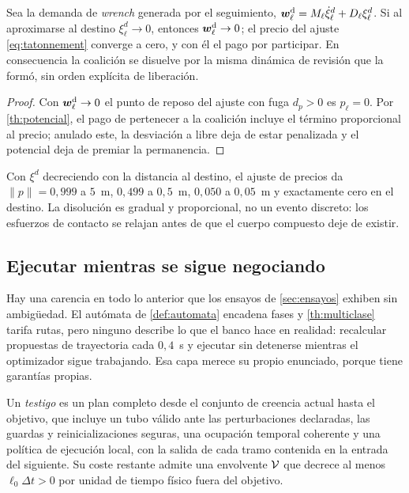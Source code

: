 \begin{proposicion}
\label{pr:extincion}
Sea la demanda de \emph{wrench} generada por el seguimiento,
$\bm{w}^{\mathrm{d}}_\ell=M_\ell\dot\xi^d_\ell+D_\ell\xi^d_\ell$. Si al aproximarse al destino
$\xi^d_\ell\to0$, entonces $\bm{w}^{\mathrm{d}}_\ell\to0$; el precio del ajuste
\eqref{eq:tatonnement} converge a cero, y con él el pago por participar. En
consecuencia la coalición se disuelve por la misma dinámica de revisión que la
formó, sin orden explícita de liberación.
\end{proposicion}

\begin{proof}
Con $\bm{w}^{\mathrm{d}}_\ell\to0$ el punto de reposo del ajuste con fuga $d_p>0$ es
$p_\ell=0$. Por \cref{th:potencial}, el pago de pertenecer a la coalición
incluye el término proporcional al precio; anulado este, la desviación a
\textsf{libre} deja de estar penalizada y el potencial deja de premiar la
permanencia.
\end{proof}

\begin{observacion}
\label{obs:extincion-num}
Con $\xi^d$ decreciendo con la distancia al destino, el ajuste de precios da
$\lVert p\rVert=0{,}999$ a $5$~m, $0{,}499$ a $0{,}5$~m, $0{,}050$ a $0{,}05$~m y
exactamente cero en el destino. La disolución es gradual y proporcional, no un
evento discreto: los esfuerzos de contacto se relajan antes de que el cuerpo
compuesto deje de existir.
\end{observacion}

\subsection{Ejecutar mientras se sigue negociando}

Hay una carencia en todo lo anterior que los ensayos de \cref{sec:ensayos}
exhiben sin ambigüedad. El autómata de \cref{def:automata} encadena fases y
\cref{th:multiclase} tarifa rutas, pero ninguno describe lo que el banco hace en
realidad: recalcular propuestas de trayectoria cada $0{,}4$~s y ejecutar sin
detenerse mientras el optimizador sigue trabajando. Esa capa merece su propio
enunciado, porque tiene garantías propias.

\begin{definicion}
\label{def:testigo}
Un \emph{testigo} es un plan completo desde el conjunto de creencia actual hasta
el objetivo, que incluye un tubo válido ante las perturbaciones declaradas, las
guardas y reinicializaciones seguras, una ocupación temporal coherente y una
política de ejecución local, con la salida de cada tramo contenida en la entrada
del siguiente. Su coste restante admite una envolvente $\mathcal{V}$ que decrece al
menos $\ell_0\Delta t>0$ por unidad de tiempo físico fuera del objetivo.
\end{definicion}

